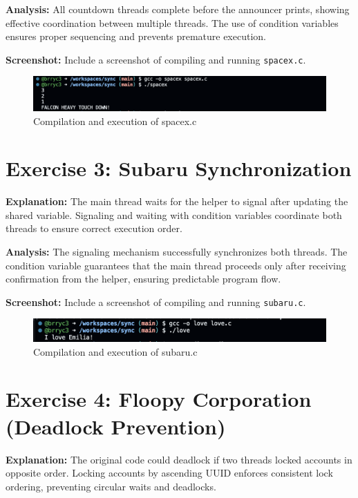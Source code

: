 \documentclass{article}
\begin{document}
\textbf{Analysis:} All countdown threads complete before the announcer prints, showing effective coordination between multiple threads. The use of condition variables ensures proper sequencing and prevents premature execution.

\textbf{Screenshot:} Include a screenshot of compiling and running \texttt{spacex.c}.
\begin{figure}[h]
\centering
\includegraphics[width=\textwidth]{exercise2_screenshot.png}
\caption{Compilation and execution of spacex.c}
\end{figure}

\section{Exercise 3: Subaru Synchronization}


\textbf{Explanation:} The main thread waits for the helper to signal after updating the shared variable. Signaling and waiting with condition variables coordinate both threads to ensure correct execution order.

\textbf{Analysis:} The signaling mechanism successfully synchronizes both threads. The condition variable guarantees that the main thread proceeds only after receiving confirmation from the helper, ensuring predictable program flow.

\textbf{Screenshot:} Include a screenshot of compiling and running \texttt{subaru.c}.
\begin{figure}[h]
\centering
\includegraphics[width=\textwidth]{exercise3_screenshot.png}
\caption{Compilation and execution of subaru.c}
\end{figure}

\section{Exercise 4: Floopy Corporation (Deadlock Prevention)}


\textbf{Explanation:} The original code could deadlock if two threads locked accounts in opposite order. Locking accounts by ascending UUID enforces consistent lock ordering, preventing circular waits and deadlocks.
\end{document}
